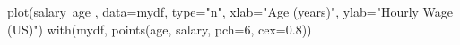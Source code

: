 \begin{Schunk}
\begin{Sinput}
 plot(salary~age , data=mydf, type="n", xlab="Age (years)", ylab="Hourly Wage (US)")
 with(mydf, points(age, salary, pch=6, cex=0.8))
\end{Sinput}
\end{Schunk}
